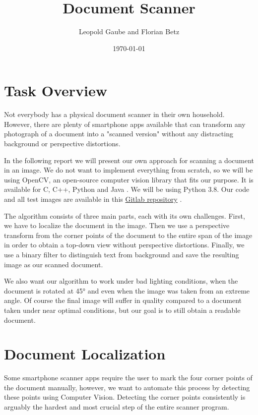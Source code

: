 \documentclass[bibliography=totoc]{scrartcl}
\title{Document Scanner}
\author{Leopold Gaube and Florian Betz}
\date{\today}
\begin{document}
	\maketitle
	\tableofcontents

	\clearpage	

    \section{Task Overview}
	Not everybody has a physical document scanner in their own household. 
	However, there are plenty of smartphone apps available that can transform any photograph of a document into a "scanned version" without any distracting background or perspective distortions.
	
	In the following report we will present our own approach for scanning a document in an image.
	We do not want to implement everything from scratch, so we will be using \acs{OpenCV}, an open-source computer vision library that fits our purpose.	
	It is available for C, C++, Python and Java \cite{OpenCV}.
	We will be using Python 3.8. Our code and all test images are available in this \hyperlink{https://gitlab.com/gaubeleo/document-scanner}{Gitlab repository} \cite{Gitlab}.
	
	The algorithm consists of three main parts, each with its own challenges.
	First, we have to localize the document in the image. 
	Then we use a perspective transform from the corner points of the document to the entire span of the image in order to obtain a top-down view without perspective distortions.
	Finally, we use a binary filter to distinguish text from background and save the resulting image as our scanned document.

	We also want our algorithm to work under bad lighting conditions, when the document is rotated at 45° and even when the image was taken from an extreme angle.
	Of course the final image will suffer in quality compared to a document taken under near optimal conditions, but our goal is to still obtain a readable document.
	
	\section{Document Localization}
	Some smartphone scanner apps require the user to mark the four corner points of the document manually, however, we want to automate this process by detecting these points using Computer Vision.
	Detecting the corner points consistently is arguably the hardest and most crucial step of the entire scanner program. 
	
\end{document}
